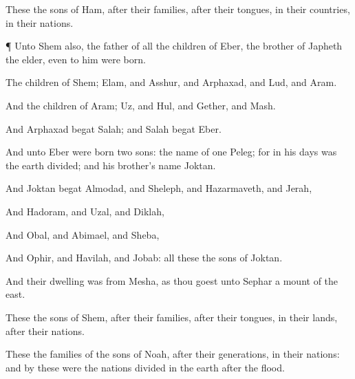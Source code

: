 {These
{} the
sons of
Ham, after their
families, after their
tongues, in their
countries,
{} in their
nations.


\par }{\PP {}¶ Unto
Shem also, the
father of all the
children of
Eber, the
brother of
Japheth the
elder, even to him were
{}
born.

The
children of
Shem;
Elam, and
Asshur, and
Arphaxad, and
Lud, and
Aram.

And the
children of
Aram;
Uz, and
Hul, and
Gether, and
Mash.

And
Arphaxad
begat
Salah; and
Salah
begat
Eber.

And unto
Eber were
born
two
sons: the
name of
one
{}
Peleg; for in his
days was the
earth
divided; and his
brother’s
name
{}
Joktan.

And
Joktan
begat
Almodad, and
Sheleph, and
Hazarmaveth, and
Jerah,

And
Hadoram, and
Uzal, and
Diklah,

And
Obal, and
Abimael, and
Sheba,

And
Ophir, and
Havilah, and
Jobab: all these
{} the
sons of
Joktan.

And their
dwelling was from
Mesha, as thou
goest unto
Sephar a
mount of the
east.

These
{} the
sons of
Shem, after their
families, after their
tongues, in their
lands, after their
nations.

These
{} the
families of the
sons of
Noah, after their
generations, in their
nations: and by these were the
nations
divided in the
earth
after the
flood.




\par }
